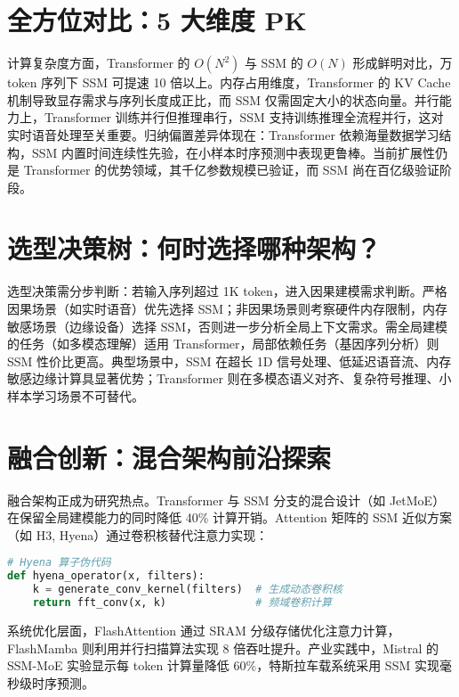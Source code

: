 \chapter{全方位对比：5 大维度 PK}
计算复杂度方面，Transformer 的 $O(N^2)$ 与 SSM 的 $O(N)$ 形成鲜明对比，万 token 序列下 SSM 可提速 10 倍以上。内存占用维度，Transformer 的 KV Cache 机制导致显存需求与序列长度成正比，而 SSM 仅需固定大小的状态向量。并行能力上，Transformer 训练并行但推理串行，SSM 支持训练推理全流程并行，这对实时语音处理至关重要。归纳偏置差异体现在：Transformer 依赖海量数据学习结构，SSM 内置时间连续性先验，在小样本时序预测中表现更鲁棒。当前扩展性仍是 Transformer 的优势领域，其千亿参数规模已验证，而 SSM 尚在百亿级验证阶段。\par
\chapter{选型决策树：何时选择哪种架构？}
选型决策需分步判断：若输入序列超过 1K token，进入因果建模需求判断。严格因果场景（如实时语音）优先选择 SSM；非因果场景则考察硬件内存限制，内存敏感场景（边缘设备）选择 SSM，否则进一步分析全局上下文需求。需全局建模的任务（如多模态理解）适用 Transformer，局部依赖任务（基因序列分析）则 SSM 性价比更高。典型场景中，SSM 在超长 1D 信号处理、低延迟语音流、内存敏感边缘计算具显著优势；Transformer 则在多模态语义对齐、复杂符号推理、小样本学习场景不可替代。\par
\chapter{融合创新：混合架构前沿探索}
融合架构正成为研究热点。Transformer 与 SSM 分支的混合设计（如 JetMoE）在保留全局建模能力的同时降低 40\%{} 计算开销。Attention 矩阵的 SSM 近似方案（如 H3, Hyena）通过卷积核替代注意力实现：\par
\begin{lstlisting}[language=python]
# Hyena 算子伪代码
def hyena_operator(x, filters):
    k = generate_conv_kernel(filters)  # 生成动态卷积核
    return fft_conv(x, k)              # 频域卷积计算
\end{lstlisting}
系统优化层面，FlashAttention 通过 SRAM 分级存储优化注意力计算，FlashMamba 则利用并行扫描算法实现 8 倍吞吐提升。产业实践中，Mistral 的 SSM-MoE 实验显示每 token 计算量降低 60\%{}，特斯拉车载系统采用 SSM 实现毫秒级时序预测。\par
